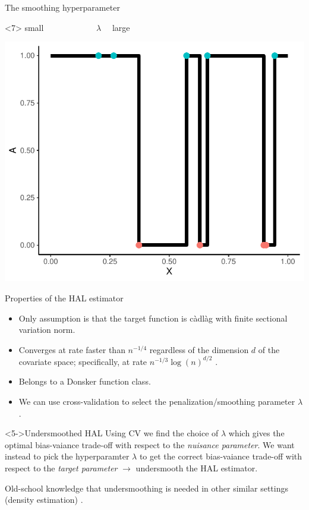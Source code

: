 \documentclass[smaller]{beamer}\usepackage{listings}
\begin{document}
\begin{frame}[label={sec:org87d521d}]{The smoothing hyperparameter}
\begin{onlyenv}<7>
\center small \(\quad \quad \quad \quad \quad \quad   \lambda \quad\) large

\begin{center}
\includegraphics[width=.9\linewidth]{./hal-smoothing5.pdf}
\end{center}
\end{onlyenv}
\end{frame}

\begin{frame}[label={sec:org26f92eb}]{Properties of the HAL estimator}
\begin{itemize}[<+->]
\item Only assumption is that the target function is càdlàg with finite sectional variation norm.
\item Converges at rate faster than \(n^{-1/4}\) regardless of the dimension \(d\) of the covariate
space; specifically, at rate \(n^{-1/3} \log(n)^{d/2}\) \citep{van2017uniform,van2017generally}.
\item Belongs to a Donsker function class.
\item We can use cross-validation to select the penalization/smoothing parameter \(\lambda\).
\end{itemize}

\begin{block}<5->{Undersmoothed HAL}
Using CV we find the choice of \(\lambda\) which gives the optimal bias-vaiance trade-off with
respect to the \emph{nuisance parameter}. \pause We want instead to pick the hyperparamter \(\lambda\)
to get the correct bias-vaiance trade-off with respect to the \emph{target parameter} \pause
\(\rightarrow\) undersmooth the HAL estimator.

\hfill

\pause Old-school knowledge that undersmoothing is needed in other similar settings (density
estimation)
\citep{laurent1996efficient,goldstein1996efficient,bickel2003nonparametric,goldstein1992optimal}.
\end{block}
\end{frame}
\end{document}

